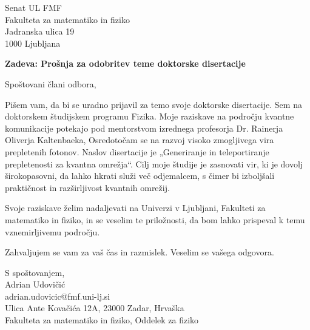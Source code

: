 \documentclass{article}
\theoremstyle{mytheoremstyle}
\theoremstyle{mytheoremstyle}
\theoremstyle{myproblemstyle}
\begin{document}
\noindent Senat UL FMF\\
Fakulteta za matematiko in fiziko\\
Jadranska ulica 19\\
1000 Ljubljana\\

\vspace{.5cm}

\begin{center}
	\textbf{Zadeva: Prošnja za odobritev teme doktorske disertacije}
\end{center}
\vspace{.5cm}

Spoštovani člani odbora,
\vspace{1cm}

Pišem vam, da bi se uradno prijavil za temo svoje doktorske disertacije. Sem na doktorskem študijskem programu Fizika.
Moje raziskave na področju kvantne komunikacije potekajo pod mentorstvom izrednega profesorja Dr. Rainerja Oliverja Kaltenbaeka,
Osredotočam se na razvoj visoko zmogljivega vira prepletenih fotonov. Naslov disertacije je „Generiranje in teleportiranje prepletenosti za kvantna omrežja“.
Cilj moje študije je zasnovati vir, ki je dovolj širokopasovni, da lahko hkrati služi več odjemalcem,
s čimer bi izboljšali praktičnost in razširljivost kvantnih omrežij.

Svoje raziskave želim nadaljevati na Univerzi v Ljubljani,
Fakulteti za matematiko in fiziko, in se veselim te priložnosti,
da bom lahko prispeval k temu vznemirljivemu področju.

Zahvaljujem se vam za vaš čas in razmislek. Veselim se vašega odgovora.



\vspace{1cm}
S spoštovanjem,\\
Adrian Udovičić\\
adrian.udovicic@fmf.uni-lj.si\\
Ulica Ante Kovačića 12A, 23000 Zadar, Hrvaška\\
Fakulteta za matematiko in fiziko, Oddelek za fiziko


\clearpage
\pagestyle{plain}

\vspace{1cm}
\end{document}
